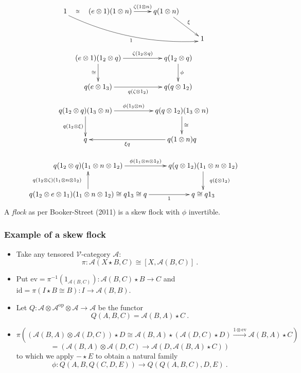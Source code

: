 \documentclass{beamer}
\newcommand{\lra}{\longrightarrow}
\def\CA{{\mathscr A}}
\def\CV{{\mathscr V}}
\begin{document}
\begin{frame}
\begin{gather*}
\begin{split}
\xymatrix{
1 \ar@{ ->}@/_3ex/@<-0.7ex>[rrrd]_-{1}="2"  \ar@{}[r]|-{\small{\cong}}  & (e\otimes 1)( 1\otimes n) \ar@{->}[r]^-{\zeta (1\otimes n)}="1" & q( 1\otimes n) \ar@{->}[rd]^-{\xi} & \\
 &&& 1 \ar@{}"1";"2"|*=0-{}
}
\end{split}
\end{gather*}
\begin{equation*}
\xymatrix{
(e\otimes1)(1_2\otimes q)\ar[rr]^-{\zeta (1_2\otimes q)} \ar[d]_-{\cong} && q(1_2 \otimes q) \ar[d]^-{\phi} \\
q(e\otimes 1_3) \ar[rr]_-{q(\zeta \otimes 1_2)} && q(q\otimes 1_2)}
\end{equation*}
\begin{equation*}
\xymatrix{
q(1_2\otimes q)(1_3\otimes n) \ar[rr]^-{\phi (1_3\otimes n)} \ar[d]_-{q(1_2\otimes \xi)} && q(q\otimes 1_2)(1_3\otimes n) \ar[d]^-{\cong} \\
q  && q(1\otimes n)q \ar[ll]^-{\xi q}}
\end{equation*}
\end{frame}
\begin{frame}
\begin{gather*}
\begin{split}
\xymatrix{
 q(1_{2}\otimes q)( 1_{1}\otimes n\otimes 1_{2}) \ar@{->}[r]^{\phi (1_{1}\otimes n\otimes 1_{2})} & q( q\otimes 1_{2})( 1_{1}\otimes n\otimes 1_{2}) \ar@{->}[d]^-{\phantom{A}q(\xi \otimes 1_{2})}="2" \\
q( 1_{2}\otimes e\otimes 1_{1})(1_{1}\otimes n\otimes 1_{2}) \cong q 1_{3} \cong q  \ar@{->}[u]^-{q( 1_{2}\otimes \zeta)( 1_{1}\otimes n\otimes 1_{2})\phantom{A}}="1" \ar@{->}[r]_-{1} & q\cong q 1_{3}
\ar@{}"1";"2"|*=0-{\phantom{....}}
}
\end{split}
\end{gather*}
\bigskip
A {\em flock} as per Booker-Street (2011) is a skew flock with $\phi$ invertible.
\end{frame}
\begin{frame}
  \frametitle{Example of a skew flock}
  \begin{itemize}
\item Take any tensored $\CV$-category $\CA$:
$$\pi : \CA (X\star B,C) \cong [X, \CA (B,C)] \ .$$
\pause
\item Put $\mathrm{ev} =\pi^{-1}(1_{\CA (B,C)}): \CA (B,C)\star B \lra C$ and $\mathrm{id}=\pi (I\star B \cong B) : I \lra \CA(B,B)$.
\pause
\item Let $Q : \CA \otimes \CA^{\mathrm{op}} \otimes \CA \lra \CA$ be the functor
$$Q(A,B,C) = \CA (B,A)\star C \ .$$
\pause
\item 
$\pi((\CA (B,A) \otimes \CA (D,C))\star D \cong \CA (B,A) \star (\CA (D,C)\star D)  \stackrel{1\otimes \mathrm{ev} }\lra \CA (B,A)\star C)$ 
$$= (\CA (B,A)\otimes \CA (D,C) \lra \CA (D,\CA (B,A)\star C))$$
to which we apply $-\star E$ to obtain a natural family
$$\phi : Q(A,B,Q(C,D,E)) \lra Q(Q(A,B,C),D,E) \ .$$ 
 \end{itemize}
\end{frame}
\end{document}
